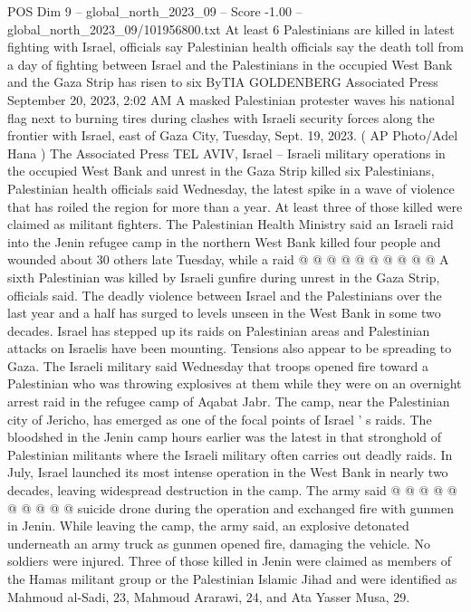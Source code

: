 \begin{textsample}{POS Dim 9 – global\_north\_2023\_09 – Score -1.00 – global\_north\_2023\_09/101956800.txt}  \label{ex:f9_pos_417}
At least 6 Palestinians are killed in latest fighting with Israel, officials say Palestinian health officials say the death toll from a day of fighting between Israel and the Palestinians in the occupied West Bank and the Gaza Strip has risen to six ByTIA GOLDENBERG Associated Press September 20, 2023, 2:02 AM A masked Palestinian protester waves his national flag next to burning tires during clashes with Israeli security forces along the frontier with Israel, east of Gaza City, Tuesday, Sept. 19, 2023. ( AP Photo/Adel Hana ) The Associated Press TEL AVIV, Israel -- Israeli military operations in the occupied West Bank and unrest in the Gaza Strip killed six Palestinians, Palestinian health officials said Wednesday, the latest spike in a wave of violence that has roiled the region for more than a year.
At least three of those killed were claimed as militant fighters.
The Palestinian Health Ministry said an Israeli raid into the Jenin refugee camp in the northern West Bank killed four people and wounded about 30 others late Tuesday, while a raid @ @ @ @ @ @ @ @ @ @ A sixth Palestinian was killed by Israeli gunfire during unrest in the Gaza Strip, officials said.
The deadly violence between Israel and the Palestinians over the last year and a half has surged to levels unseen in the West Bank in some two decades.
Israel has stepped up its raids on Palestinian areas and Palestinian attacks on Israelis have been mounting.
Tensions also appear to be spreading to Gaza.
The Israeli military said Wednesday that troops opened fire toward a Palestinian who was throwing explosives at them while they were on an overnight arrest raid in the refugee camp of Aqabat Jabr.
The camp, near the Palestinian city of Jericho, has emerged as one of the focal points of Israel ' s raids.
The bloodshed in the Jenin camp hours earlier was the latest in that stronghold of Palestinian militants where the Israeli military often carries out deadly raids.
In July, Israel launched its most intense operation in the West Bank in nearly two decades, leaving widespread destruction in the camp.
The army said @ @ @ @ @ @ @ @ @ @ suicide drone during the operation and exchanged fire with gunmen in Jenin.
While leaving the camp, the army said, an explosive detonated underneath an army truck as gunmen opened fire, damaging the vehicle.
No soldiers were injured.
Three of those killed in Jenin were claimed as members of the Hamas militant group or the Palestinian Islamic Jihad and were identified as Mahmoud al-Sadi, 23, Mahmoud Ararawi, 24, and Ata Yasser Musa, 29.

\end{textsample}
